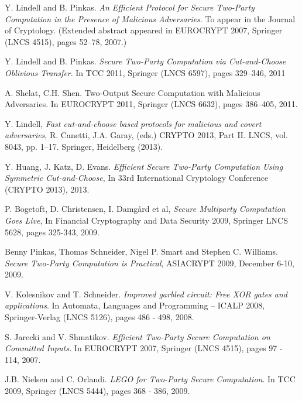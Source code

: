 \documentclass[a4paper,11pt]{article}
\begin{document}
	\begin{thebibliography}{5}
	
			Y. Lindell and B. Pinkas. \emph{An Efficient Protocol for Secure Two-Party Computation in the Presence of Malicious Adversaries}. To appear in the Journal of Cryptology. (Extended abstract appeared in EUROCRYPT 2007, Springer (LNCS 4515), pages 52–78, 2007.)

			Y. Lindell and B. Pinkas. \emph{Secure Two-Party Computation via Cut-and-Choose Oblivious Transfer}. In TCC 2011, Springer (LNCS 6597), pages 329–346, 2011

			A. Shelat, C.H. Shen. Two-Output Secure Computation with Malicious Adversaries. In EUROCRYPT 2011, Springer (LNCS 6632), pages 386–405, 2011.

			Y. Lindell,
			\emph{Fast cut-and-choose based protocols for malicious and covert adversaries}, R. Canetti, J.A. Garay, (eds.) CRYPTO 2013, Part II. LNCS, vol. 8043, pp. 1–17. Springer, Heidelberg (2013).

			Y. Huang, J. Katz, D. Evans. \emph{Efficient Secure Two-Party Computation Using Symmetric Cut-and-Choose}, In 33rd International Cryptology Conference (CRYPTO 2013), 2013.

			P. Bogetoft, D. Christensen, I. Damgård et al, \emph{Secure Multiparty Computation Goes Live}, In Financial Cryptography and Data Security 2009, Springer LNCS 5628, pages 325-343, 2009.

			Benny Pinkas, Thomas Schneider, Nigel P. Smart and Stephen C. Williams. \emph{Secure Two-Party Computation is Practical}, ASIACRYPT 2009, December 6-10, 2009.

			V. Kolesnikov and T. Schneider. \emph{Improved garbled circuit: Free XOR gates and applications}. In Automata, Languages and Programming – ICALP 2008, Springer-Verlag (LNCS 5126), pages 486 - 498, 2008.

			S. Jarecki and V. Shmatikov. \emph{Efficient Two-Party Secure Computation on Committed Inputs.} In EUROCRYPT 2007, Springer (LNCS 4515), pages 97 - 114, 2007.

			J.B. Nielsen and C. Orlandi. \emph{LEGO for Two-Party Secure Computation}. In TCC 2009, Springer (LNCS 5444), pages 368 - 386, 2009.


\end{thebibliography}
\end{document}
